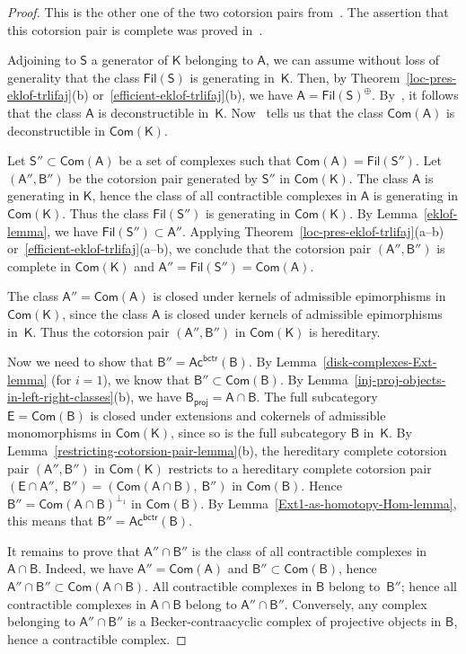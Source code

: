\documentclass[12pt,a4paper]{amsart}
\newcommand{\+}{\nobreakdash-}
\renewcommand{\:}{\colon}
\newcommand{\sA}{\mathsf A}
\newcommand{\sB}{\mathsf B}
\newcommand{\sE}{\mathsf E}
\newcommand{\sK}{\mathsf K}
\newcommand{\sS}{\mathsf S}
\newcommand{\Com}{\mathsf{Com}}
\newcommand{\Ac}{\mathsf{Ac}}
\newcommand{\Fil}{\mathsf{Fil}}
\newcommand{\proj}{\mathsf{proj}}
\newcommand{\bctr}{\mathsf{bctr}}
\theoremstyle{plain}
\theoremstyle{definition}
\begin{document}
\begin{proof}
 This is the other one of the two cotorsion pairs
from~\cite[Proposition~3.2]{Gil2}.
 The assertion that this cotorsion pair is complete was proved
in~\cite[Lemma~4.9]{Gil3}.

 Adjoining to $\sS$ a generator of $\sK$ belonging to $\sA$, we can
assume without loss of generality that the class $\Fil(\sS)$ is
generating in~$\sK$.
 Then, by Theorem~\ref{loc-pres-eklof-trlifaj}(b)
or~\ref{efficient-eklof-trlifaj}(b), we have $\sA=\Fil(\sS)^\oplus$.
 By~\cite[Proposition~2.9(1)]{Sto-hill}, it follows that the class
$\sA$ is deconstructible in~$\sK$.
 Now~\cite[Proposition~4.3]{Sto-hill} tells us that the class
$\Com(\sA)$ is deconstructible in $\Com(\sK)$.

 Let $\sS''\subset\Com(\sA)$ be a set of complexes such that
$\Com(\sA)=\Fil(\sS'')$.
 Let $(\sA'',\sB'')$ be the cotorsion pair generated by $\sS''$ in
$\Com(\sK)$.
 The class $\sA$ is generating in $\sK$, hence the class of all
contractible complexes in $\sA$ is generating in $\Com(\sK)$.
 Thus the class $\Fil(\sS'')$ is generating in $\Com(\sK)$.
 By Lemma~\ref{eklof-lemma}, we have $\Fil(\sS'')\subset\sA''$.
 Applying Theorem~\ref{loc-pres-eklof-trlifaj}(a\+-b)
or~\ref{efficient-eklof-trlifaj}(a\+-b), we conclude that
the cotorsion pair $(\sA'',\sB'')$ is complete in $\Com(\sK)$
and $\sA''=\Fil(\sS'')=\Com(\sA)$.

 The class $\sA''=\Com(\sA)$ is closed under kernels of admissible
epimorphisms in $\Com(\sK)$, since the class $\sA$ is closed under
kernels of admissible epimorphisms in~$\sK$.
 Thus the cotorsion pair $(\sA'',\sB'')$ in $\Com(\sK)$ is hereditary.

 Now we need to show that $\sB''=\Ac^\bctr(\sB)$.
 By Lemma~\ref{disk-complexes-Ext-lemma} (for $i=1$), we know that
$\sB''\subset\Com(\sB)$.
 By Lemma~\ref{inj-proj-objects-in-left-right-classes}(b), we have
$\sB_\proj=\sA\cap\sB$.
 The full subcategory $\sE=\Com(\sB)$ is closed under extensions and
cokernels of admissible monomorphisms in $\Com(\sK)$, since so is
the full subcategory $\sB$ in~$\sK$.
 By Lemma~\ref{restricting-cotorsion-pair-lemma}(b), the hereditary
complete cotorsion pair $(\sA'',\sB'')$ in $\Com(\sK)$ restricts to
a hereditary complete cotorsion pair $(\sE\cap\sA'',\>\sB'')=
(\Com(\sA\cap\sB),\>\sB'')$ in $\Com(\sB)$.
 Hence $\sB''=\Com(\sA\cap\sB)^{\perp_1}$ in $\Com(\sB)$.
 By Lemma~\ref{Ext1-as-homotopy-Hom-lemma}, this means that
$\sB''=\Ac^\bctr(\sB)$.

 It remains to prove that $\sA''\cap\sB''$ is the class of all
contractible complexes in $\sA\cap\sB$.
 Indeed, we have $\sA''=\Com(\sA)$ and $\sB''\subset\Com(\sB)$, hence
$\sA''\cap\sB''\subset\Com(\sA\cap\sB)$.
 All contractible complexes in $\sB$ belong to~$\sB''$; hence all
contractible complexes in $\sA\cap\sB$ belong to $\sA''\cap\sB''$.
 Conversely, any complex belonging to $\sA''\cap\sB''$ is
a Becker-contraacyclic complex of projective objects in $\sB$, hence
a contractible complex.
\end{proof}
\end{document}

